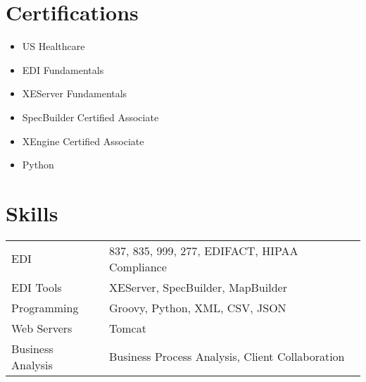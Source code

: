 \documentclass[a4paper,11pt]{article}
\begin{document}
\section{Certifications}
\begin{multicols}{2}
\begin{itemize}[leftmargin=1em,itemsep=2pt]
    \item US Healthcare
    \item EDI Fundamentals
    \item XEServer Fundamentals
    \item SpecBuilder Certified Associate
    \item XEngine Certified Associate
    \item Python
\end{itemize}
\end{multicols}

\section{Skills}
\begin{tabularx}{\linewidth}{@{}l X@{}}
EDI & 837, 835, 999, 277, EDIFACT, HIPAA Compliance \\
EDI Tools & XEServer, SpecBuilder, MapBuilder \\
Programming & Groovy, Python, XML, CSV, JSON \\
Web Servers & Tomcat \\
Business Analysis & Business Process Analysis, Client Collaboration \\
\end{tabularx}

\vfill
{}
\end{document}
